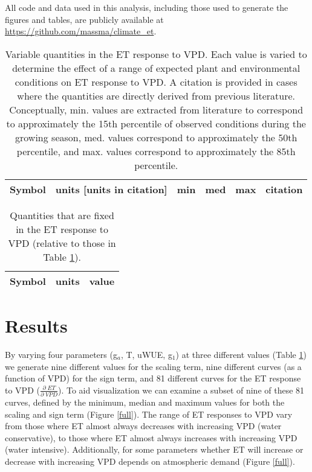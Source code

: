 All code and data used in this analysis, including those used to
generate the figures and tables, are publicly available at
\url{https://github.com/massma/climate_et}.

\begin{table}
  \caption{Variable quantities in the ET response to VPD. Each value
    is varied to determine the effect of a range of expected plant and
    environmental conditions on ET response to VPD. A citation is
    provided in cases where the quantities are directly derived from
    previous literature. Conceptually, min. values are extracted from
    literature to correspond to approximately the 15th percentile of
    observed conditions during the growing season, med. values
    correspond to approximately the 50th percentile, and max. values
    correspond to approximately the 85th percentile.}
  \label{param_varying}
  \centering
  \footnotesize
  \begin{tabular}{l c c c c c}
    \hline
    Symbol & units [units in citation] & min  & med & max
    & citation  \\
    \hline
    
    \hline
  \end{tabular}
\end{table}

\begin{table}
  \caption{Quantities that are fixed in the ET response to VPD
    (relative to those in Table \ref{param_varying}).}
  \label{param_fixed}
  \centering
  \begin{tabular}{l c c}
    \hline
    Symbol & units & value \\
    \hline
    
    \hline
  \end{tabular}
\end{table}

\section{Results}
\label{results}

By varying four parameters (g$_a$, T, uWUE, g$_1$) at three different
values (Table \ref{param_varying}) we generate nine different values
for the scaling term, nine different curves (as a function of VPD) for
the sign term, and 81 different curves for the ET response to VPD
($\frac{\partial \; ET}{\partial \; VPD}$). To aid visualization we
can examine a subset of nine of these 81 curves, defined by the
minimum, median and maximum values for both the scaling and sign term
(Figure \ref{full}). The range of ET responses to VPD vary from those
where ET almost always decreases with increasing VPD (water
conservative), to those where ET almost always increases with
increasing VPD (water intensive). Additionally, for some parameters
whether ET will increase or decrease with increasing VPD depends on
atmospheric demand (Figure \ref{full}).

